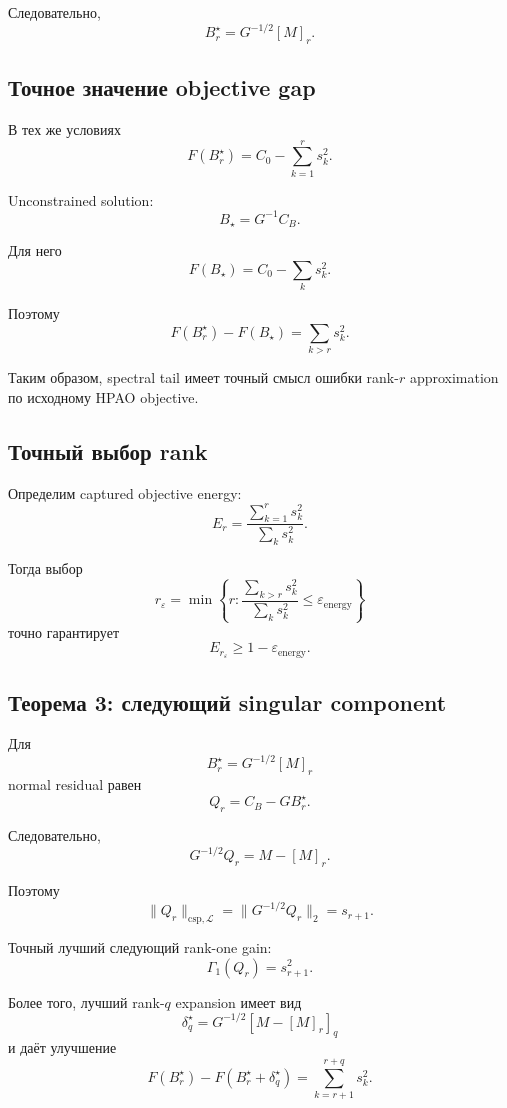 Следовательно,
\[
\boxed{
    B_r^\star
    =
    G^{-1/2}[M]_r.
}
\]

\subsection{Точное значение objective gap}

В тех же условиях
\[
\boxed{
    F(B_r^\star)
    =
    C_0
    -
    \sum_{k=1}^r s_k^2.
}
\]

Unconstrained solution:
\[
\boxed{
    B_\star
    =
    G^{-1}C_B.
}
\]

Для него
\[
\boxed{
    F(B_\star)
    =
    C_0
    -
    \sum_k s_k^2.
}
\]

Поэтому
\[
\boxed{
    F(B_r^\star)
    -
    F(B_\star)
    =
    \sum_{k>r}s_k^2.
}
\]

Таким образом, spectral tail имеет точный смысл ошибки
rank-$r$ approximation по исходному HPAO objective.

\subsection{Точный выбор rank}

Определим captured objective energy:
\[
\boxed{
    E_r
    =
    \frac{
        \sum_{k=1}^r s_k^2
    }{
        \sum_k s_k^2
    }.
}
\]

Тогда выбор
\[
\boxed{
    r_\varepsilon
    =
    \min
    \left\{
        r:
        \frac{
            \sum_{k>r}s_k^2
        }{
            \sum_ks_k^2
        }
        \le
        \varepsilon_{\mathrm{energy}}
    \right\}
}
\]
точно гарантирует
\[
    E_{r_\varepsilon}
    \ge
    1-\varepsilon_{\mathrm{energy}}.
\]

\subsection{Теорема 3: следующий singular component}

Для
\[
    B_r^\star
    =
    G^{-1/2}[M]_r
\]
normal residual равен
\[
    Q_r
    =
    C_B-GB_r^\star.
\]

Следовательно,
\[
\boxed{
    G^{-1/2}Q_r
    =
    M-[M]_r.
}
\]

Поэтому
\[
\boxed{
    \|Q_r\|_{\mathrm{csp},\mathcal L}
    =
    \|G^{-1/2}Q_r\|_2
    =
    s_{r+1}.
}
\]

Точный лучший следующий rank-one gain:
\[
\boxed{
    \Gamma_1(Q_r)=s_{r+1}^2.
}
\]

Более того, лучший rank-$q$ expansion имеет вид
\[
\boxed{
    \delta_q^\star
    =
    G^{-1/2}
    [M-[M]_r]_q
}
\]
и даёт улучшение
\[
\boxed{
    F(B_r^\star)
    -
    F(B_r^\star+\delta_q^\star)
    =
    \sum_{k=r+1}^{r+q}s_k^2.
}
\]

